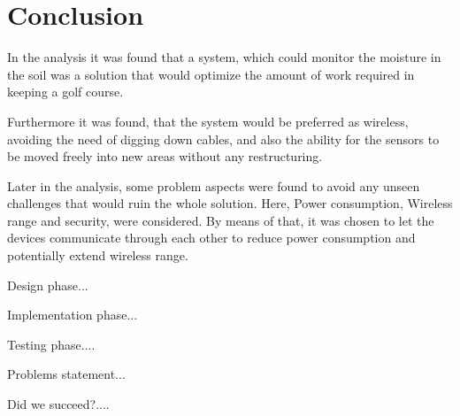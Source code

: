\section{Conclusion}
In the analysis it was found that a system, which could monitor the moisture in the soil was a solution that would optimize the amount of work required in keeping a golf course.

Furthermore it was found, that the system would be preferred as wireless, avoiding the need of digging down cables, and also the ability for the sensors to be moved freely into new areas without any restructuring.

Later in the analysis, some problem aspects were found to avoid any unseen challenges that would ruin the whole solution. Here, Power consumption, Wireless range and security, were considered. By means of that, it was chosen to let the devices communicate through each other to reduce power consumption and potentially extend wireless range.

Design phase...

Implementation phase...

Testing phase....

Problems statement...

Did we succeed?....

